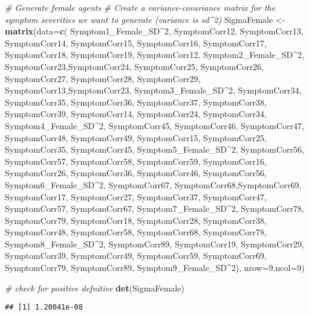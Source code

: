 \documentclass[]{article}
\newenvironment{Shaded}{\begin{snugshade}}{\end{snugshade}}
\newcommand{\KeywordTok}[1]{\textcolor[rgb]{0.13,0.29,0.53}{\textbf{#1}}}
\newcommand{\DataTypeTok}[1]{\textcolor[rgb]{0.13,0.29,0.53}{#1}}
\newcommand{\DecValTok}[1]{\textcolor[rgb]{0.00,0.00,0.81}{#1}}
\newcommand{\StringTok}[1]{\textcolor[rgb]{0.31,0.60,0.02}{#1}}
\newcommand{\CommentTok}[1]{\textcolor[rgb]{0.56,0.35,0.01}{\textit{#1}}}
\newcommand{\OperatorTok}[1]{\textcolor[rgb]{0.81,0.36,0.00}{\textbf{#1}}}
\newcommand{\NormalTok}[1]{#1}
\begin{document}
\begin{Shaded}
\begin{Highlighting}[]
\CommentTok{# Generate female agents}
\CommentTok{# Create a variance-covariance matrix for the symptom severities we want to generate (variance is sd^2)}
\NormalTok{SigmaFemale <-}\StringTok{ }\KeywordTok{matrix}\NormalTok{(}\DataTypeTok{data=}\KeywordTok{c}\NormalTok{(}
\NormalTok{  Symptom1_Female_SD}\OperatorTok{^}\DecValTok{2}\NormalTok{, SymptomCorr12, SymptomCorr13, SymptomCorr14, SymptomCorr15, SymptomCorr16, SymptomCorr17, SymptomCorr18, SymptomCorr19,}
\NormalTok{  SymptomCorr12, Symptom2_Female_SD}\OperatorTok{^}\DecValTok{2}\NormalTok{, SymptomCorr23,SymptomCorr24, SymptomCorr25, SymptomCorr26, SymptomCorr27, SymptomCorr28, SymptomCorr29,}
\NormalTok{  SymptomCorr13,SymptomCorr23, Symptom3_Female_SD}\OperatorTok{^}\DecValTok{2}\NormalTok{, SymptomCorr34, SymptomCorr35, SymptomCorr36, SymptomCorr37, SymptomCorr38, SymptomCorr39,}
\NormalTok{  SymptomCorr14, SymptomCorr24, SymptomCorr34, Symptom4_Female_SD}\OperatorTok{^}\DecValTok{2}\NormalTok{, SymptomCorr45, SymptomCorr46, SymptomCorr47, SymptomCorr48, SymptomCorr49,}
\NormalTok{  SymptomCorr15, SymptomCorr25, SymptomCorr35, SymptomCorr45, Symptom5_Female_SD}\OperatorTok{^}\DecValTok{2}\NormalTok{, SymptomCorr56, SymptomCorr57, SymptomCorr58, SymptomCorr59,}
\NormalTok{  SymptomCorr16, SymptomCorr26, SymptomCorr36, SymptomCorr46, SymptomCorr56, Symptom6_Female_SD}\OperatorTok{^}\DecValTok{2}\NormalTok{, SymptomCorr67, SymptomCorr68,SymptomCorr69,}
\NormalTok{  SymptomCorr17, SymptomCorr27, SymptomCorr37, SymptomCorr47, SymptomCorr57, SymptomCorr67, Symptom7_Female_SD}\OperatorTok{^}\DecValTok{2}\NormalTok{, SymptomCorr78, SymptomCorr79,}
\NormalTok{  SymptomCorr18, SymptomCorr28, SymptomCorr38, SymptomCorr48, SymptomCorr58, SymptomCorr68, SymptomCorr78, Symptom8_Female_SD}\OperatorTok{^}\DecValTok{2}\NormalTok{, SymptomCorr89,}
\NormalTok{  SymptomCorr19, SymptomCorr29, SymptomCorr39, SymptomCorr49, SymptomCorr59, SymptomCorr69, SymptomCorr79, SymptomCorr89, Symptom9_Female_SD}\OperatorTok{^}\DecValTok{2}\NormalTok{),     }
  \DataTypeTok{nrow=}\DecValTok{9}\NormalTok{,}\DataTypeTok{ncol=}\DecValTok{9}\NormalTok{)}

\CommentTok{# check for positive defnitive}
\KeywordTok{det}\NormalTok{(SigmaFemale)}
\end{Highlighting}
\end{Shaded}

\begin{verbatim}
## [1] 1.20041e-08
\end{verbatim}
\end{document}
